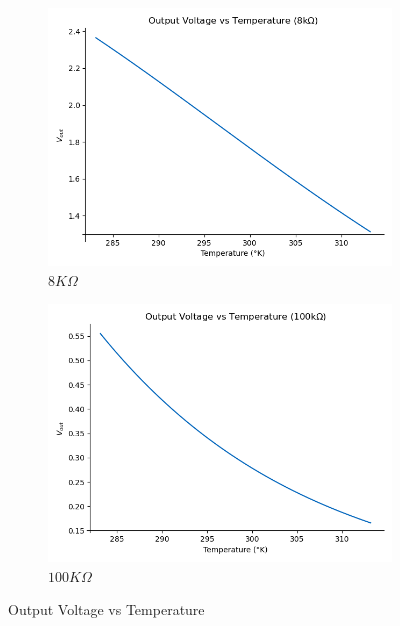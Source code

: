 \documentclass[12pt]{article}
\begin{document}
    \begin{figure}[H]
        \centering
        \begin{subfigure}{0.45\textwidth}
            \centering
            \includegraphics[width=\textwidth]{images/VoutPorTemp.png}
            \caption{ $8K\Omega$ }
        \end{subfigure}\hfill
        \begin{subfigure}{0.45\textwidth}
            \centering
            \includegraphics[width=\textwidth]{images/VoutPorTemp100k.png}
            \caption{$100K\Omega$}
        \end{subfigure}
        \caption{Output Voltage vs Temperature}
    \end{figure}
\end{document}
